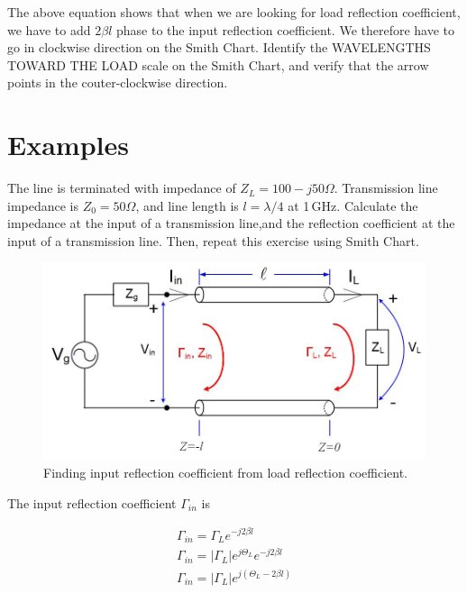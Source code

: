 \documentclass{ximera}
\begin{document}
The above equation shows that when we are looking for load reflection coefficient, we have to add $2 \beta l$ phase to the input reflection coefficient. We therefore have to go in clockwise direction on the Smith Chart. Identify the WAVELENGTHS TOWARD THE LOAD scale on the Smith Chart, and 
verify that the arrow points in the couter-clockwise direction. 


\section{Examples}

\begin{example}


The line is  terminated with impedance of $Z_L= 100-j50 \Omega$. Transmission line impedance is $Z_0=50 \Omega$, and line length is $l=\lambda/4$ at 1\,GHz. Calculate the impedance at the input of a transmission line,and  the
reflection coefficient at the input of a transmission line.
Then, repeat this exercise using Smith Chart.


\begin{figure}[htbp]
\begin{center}
\includegraphics[scale=0.6]{../jpg/trline.jpg}
\end{center}
\caption{Finding input reflection coefficient from load reflection coefficient.}
\label{fig:SCImpRefExample1SchDia}
\end{figure}

\begin{explanation}

The input reflection coefficient $\Gamma_{in}$ is 

\begin{eqnarray}
\Gamma_{in}=\Gamma_L e^{-j2 \beta l} \\
\Gamma_{in} = |\Gamma_L| e^{j \Theta_{L}} e^{-j2 \beta l} \\
\Gamma_{in} = |\Gamma_L| e^{j(\Theta_{L} -2 \beta l) } 
\end{eqnarray}


\end{explanation}
\end{example}
\end{document}
